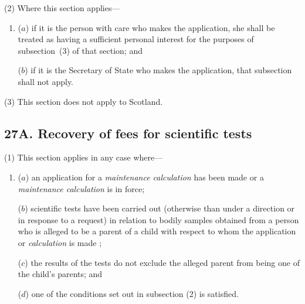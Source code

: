 \documentclass[12pt,a4paper]{article}
\begin{document}
(2) Where this section applies—
\begin{enumerate}\item[]
($a$) if it is the person with care who makes the application, she shall be treated as having a sufficient personal interest for the purposes of subsection~(3)  of that section; and

($b$) if it is the 
Secretary of State  %
who makes the application, that subsection shall not apply.
\end{enumerate}

(3) This section does not apply to Scotland.


\subsection{27A. Recovery of fees for scientific tests}

(1) This section applies in any case where—
\begin{enumerate}\item[]
($a$) an application for a 
\emph{maintenance calculation}  %
has been made 
or a 
\emph{maintenance calculation}  %
is in force;

($b$) scientific tests have been carried out (otherwise than under a direction or in response to a request) in relation to bodily samples obtained from a person who is alleged to be a parent of a child with respect to whom the application or 
\emph{calculation}  %
is made%
;

($c$) the results of the tests do not exclude the alleged parent from being one of the child’s parents; and

($d$) one of the conditions set out in subsection (2) is satisfied.
\end{enumerate}
\end{document}
